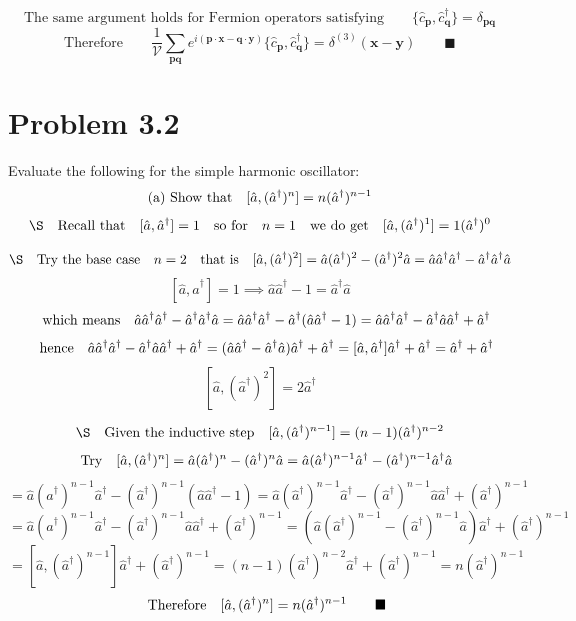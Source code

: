 \documentclass{amsart}
\begin{document}
\[\text{The same argument holds for Fermion operators satisfying}\qquad\{\hat{c}_{\boldsymbol{p}},\hat{c}^\dagger_{\boldsymbol{q}}\}  = \delta_{\boldsymbol{pq}}  \]
\[\text{Therefore}\qquad\frac{1}{\mathcal{V}}\sum_{\boldsymbol{pq}}e^{i(\boldsymbol{p\cdot x}-\boldsymbol{q\cdot y})}\{\hat{c}_{\boldsymbol{p}},\hat{c}^\dagger_{\boldsymbol{q}}\}=\delta^{(3)} (\boldsymbol{x}-\boldsymbol{y})\qquad\blacksquare\]

\section*{Problem 3.2}
Evaluate the following for the simple harmonic oscillator:
\[\qq*{(a) Show that}[\hat{a},(\hat{a}^\dagger)^n]= n(\hat{a}^\dagger)^{n-1}  \]
\[\S\qq{Recall that}[\hat{a},\hat{a}^\dagger] = 1\qq{so for}n=1\qq{we do get}[\hat{a},(\hat{a}^\dagger)^1] =1(\hat{a}^\dagger)^0 \]

\[\S\qq{Try the base case} n=2\qq{that is}[\hat{a},(\hat{a}^\dagger)^2] = \hat{a}(\hat{a}^\dagger)^2-(\hat{a}^\dagger)^2 \hat{a} = \hat{a}\hat{a}^\dagger \hat{a}^\dagger-\hat{a}^\dagger \hat{a}^\dagger \hat{a}   \]
\[[\hat{a},\hat{a}^\dagger] = 1 \implies \hat{a}\hat{a}^\dagger -1 =  \hat{a}^\dagger \hat{a}\]
\[\qq{which means}\hat{a}\hat{a}^\dagger \hat{a}^\dagger-\hat{a}^\dagger \hat{a}^\dagger \hat{a} =\hat{a}\hat{a}^\dagger \hat{a}^\dagger-\hat{a}^\dagger (\hat{a}\hat{a}^\dagger -1 ) =\hat{a}\hat{a}^\dagger \hat{a}^\dagger-\hat{a}^\dagger \hat{a}\hat{a}^\dagger +\hat{a}^\dagger\]
\[\qq{hence}\hat{a}\hat{a}^\dagger \hat{a}^\dagger-\hat{a}^\dagger \hat{a}\hat{a}^\dagger +\hat{a}^\dagger=(\hat{a}\hat{a}^\dagger -\hat{a}^\dagger \hat{a})\hat{a}^\dagger +\hat{a}^\dagger   =[\hat{a},\hat{a}^\dagger] \hat{a}^\dagger +\hat{a}^\dagger  = \hat{a}^\dagger +\hat{a}^\dagger \]
\[ [\hat{a},(\hat{a}^\dagger)^2]   =2\hat{a}^\dagger \]

\[\S\qq{Given the inductive step}[\hat{a},(\hat{a}^\dagger)^{n-1}] =(n-1)(\hat{a}^\dagger)^{n-2} \]
\[\qq{Try}[\hat{a},(\hat{a}^\dagger)^n]=\hat{a}(\hat{a}^\dagger)^n-(\hat{a}^\dagger)^n \hat{a}=\hat{a}(\hat{a}^\dagger)^{n-1}\hat{a}^\dagger-(\hat{a}^\dagger)^{n-1}\hat{a}^\dagger \hat{a}\]
\[=\hat{a}(\hat{a}^\dagger)^{n-1}\hat{a}^\dagger-(\hat{a}^\dagger)^{n-1}(\hat{a}\hat{a}^\dagger -1 )=\hat{a}(\hat{a}^\dagger)^{n-1}\hat{a}^\dagger-(\hat{a}^\dagger)^{n-1}\hat{a}\hat{a}^\dagger +(\hat{a}^\dagger)^{n-1}\]
\[=\hat{a}(\hat{a}^\dagger)^{n-1}\hat{a}^\dagger-(\hat{a}^\dagger)^{n-1}\hat{a}\hat{a}^\dagger +(\hat{a}^\dagger)^{n-1}=(\hat{a}(\hat{a}^\dagger)^{n-1}-(\hat{a}^\dagger)^{n-1}\hat{a})\hat{a}^\dagger +(\hat{a}^\dagger)^{n-1}\]
\[=[\hat{a},(\hat{a}^\dagger)^{n-1}]\hat{a}^\dagger +(\hat{a}^\dagger)^{n-1}=(n-1)(\hat{a}^\dagger)^{n-2}\hat{a}^\dagger+(\hat{a}^\dagger)^{n-1}=n(\hat{a}^\dagger)^{n-1}\]
\[\qq{Therefore}[\hat{a},(\hat{a}^\dagger)^n]=n(\hat{a}^\dagger)^{n-1}\qquad\blacksquare\]
\end{document}
